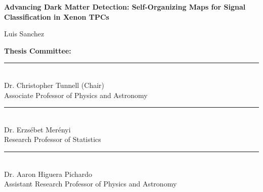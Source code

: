 \documentclass[12pt]{article}
\begin{document}
    \begin{titlepage}
    \centering
    
    \vspace*{\fill}
    
    \vspace*{0.5cm}
    
    \huge\bfseries
     Advancing Dark Matter Detection: Self-Organizing Maps for Signal Classification in Xenon TPCs \\
    
    \vspace*{0.5cm}

    \Large Luis Sanchez \\

    \vspace{2cm} %
    \normalsize 

    \begin{flushleft}
    \noindent\textbf{Thesis Committee:}
    
    \vspace{1.5cm}
    
    \noindent\rule{8cm}{0.4pt}\\
    Dr. Christopher Tunnell (Chair)\\
    Associate Professor of Physics and Astronomy
    
    \vspace{1.2cm}
    
    \noindent\rule{8cm}{0.4pt}\\
    Dr. Erzsébet Merényi\\
    Research Professor of Statistics

    \vspace{1.2cm}
    
    \noindent\rule{8cm}{0.4pt}\\
    Dr. Aaron Higuera Pichardo\\
    Assistant Research Professor of Physics and Astronomy
    \end{flushleft}
    
    \vspace*{\fill}
    
    \end{titlepage}



\newpage

\tableofcontents

\newpage

\printacronyms
\end{document}
